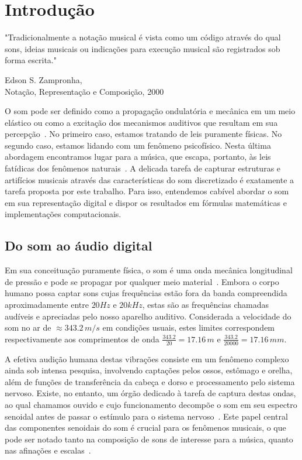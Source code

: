 \chapter{Introdução} %
\label{cap:intro} 
\epigraph{"Tradicionalmente a notação musical é vista como um código através do qual sons, ideias musicais ou indicações para execução musical são registrados sob forma escrita."}{Edson S. Zampronha, \\ Notação, Representação e Composição, 2000}


O som pode ser definido como a propagação ondulatória e mecânica em um meio elástico
ou como a excitação dos mecanismos auditivos que resultam em sua percepção~\cite{Everest}. No primeiro
caso, estamos tratando de leis puramente físicas. No segundo caso, estamos lidando com um
fenômeno psicofísico. Nesta última abordagem encontramos lugar para a música, que escapa,
portanto, às leis fatídicas dos fenômenos naturais~\cite{Roederer}. A delicada tarefa de capturar estruturas
e artifícios musicais através das características do som discretizado
é exatamente a tarefa proposta por este trabalho. Para isso, entendemos cabível
abordar o som em sua representação digital e dispor os resultados em fórmulas matemáticas e implementações computacionais. 


    \section{Do som ao áudio digital}

Em sua conceituação puramente física, o som é uma onda mecânica longitudinal de pressão e pode se propagar por qualquer meio material~\cite{}.
Embora o corpo humano possa captar sons cujas frequências estão fora da banda compreendida aproximadamente entre $20Hz$ e $20 kHz$, estas são as frequências chamadas audíveis e apreciadas pelo nosso aparelho auditivo.
 Considerada a velocidade do som no ar de $\approx 343.2\,m/s$ em condições usuais,
estes limites correspondem respectivamente aos comprimentos de onda $\frac{343.2}{20} = 17.16\,m$ e $\frac{343.2}{20000}=17.16\,mm$.

A efetiva audição humana destas vibrações consiste em um fenômeno complexo ainda sob intensa pesquisa, involvendo captações pelos ossos, estômago e orelha, além de funções de transferência da cabeça e dorso e processamento pelo sistema nervoso. Existe, no entanto, um órgão dedicado à tarefa de captura destas ondas, ao qual chamamos ouvido e cujo funcionamento decompõe o som em seu espectro senoidal antes de passar o estímulo para o sistema nervoso~\cite{Roederer}. Este papel central das componentes senoidais do som é crucial para os fenômenos musicais, o que pode ser notado tanto na composição de sons de interesse para a música, quanto nas afinações e escalas~\cite{floEsp}.

